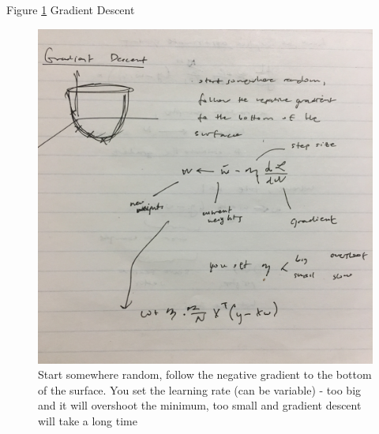 Figure \ref{fig:example_figure9} Gradient Descent
\begin{figure}[ht]
  \begin{center}
    \includegraphics[width=.9\textwidth,angle=270]{figures/7.jpg}
    \caption{
      Start somewhere random, follow the negative gradient to the bottom of the surface.
      You set the learning rate (can be variable) - too big and it will overshoot the minimum, 
      too small and gradient descent will take a long time}
    \label{fig:example_figure9}
  \end{center}
\end{figure}

\pagebreak

